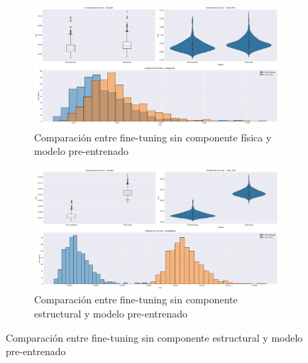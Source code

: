 \begin{figure}[H]
    \centering
    \begin{subfigure}[b]{0.48\textwidth}
        \centering
        \includegraphics[width=\textwidth]{Images/comparison_plots_mae_no_phy.png}
        \caption{Comparación entre fine-tuning sin componente física y modelo pre-entrenado}
        \label{fig:mae_hist}
    \end{subfigure}
    \hfill
    \begin{subfigure}[b]{0.48\textwidth}
        \centering
        \includegraphics[width=\textwidth]{Images/comparison_plots_mae_no_struct.png}
        \caption{Comparación entre fine-tuning sin componente estructural y modelo pre-entrenado}
        \label{fig:mae_violin}
    \end{subfigure}
    
    \vspace{0.5cm}
    

\end{figure}
